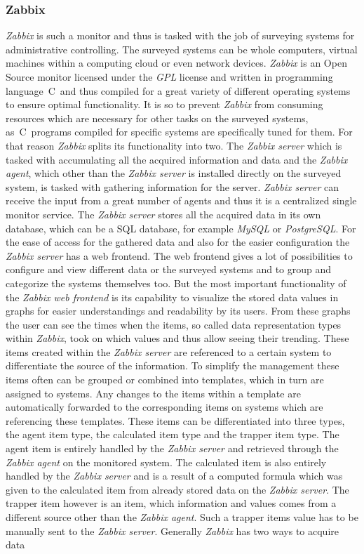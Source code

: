 \subsubsection{Zabbix}
	\textit{Zabbix} is such a monitor and thus is tasked with the job of surveying systems for administrative controlling. The surveyed systems can be whole computers, virtual machines within a computing cloud or even network devices. \textit{Zabbix} is an Open Source monitor licensed under the \textit{GPL} license and written in programming language\ C\ and thus compiled for a great variety of different operating systems to ensure optimal functionality. It is so to prevent \textit{Zabbix} from consuming resources which are necessary for other tasks on the surveyed systems, as\ C\ programs compiled for specific systems are specifically tuned for them. For that reason \textit{Zabbix} splits its functionality into two. The \textit{Zabbix server} which is tasked with accumulating all the acquired information and data and the \textit{Zabbix agent}, which other than the \textit{Zabbix server} is installed directly on the surveyed system, is tasked with gathering information for the server. \textit{Zabbix server} can receive the input from a great number of agents and thus it is a centralized single monitor service. The \textit{Zabbix server} stores all the acquired data in its own database, which can be a SQL database, for example \textit{MySQL} or \textit{PostgreSQL}. For the ease of access for the gathered data and also for the easier configuration the \textit{Zabbix server} has a web frontend. The web frontend gives a lot of possibilities to configure and view different data or the surveyed systems and to group and categorize the systems themselves too. But the most important functionality of the \textit{Zabbix web frontend} is its capability to visualize the stored data values in graphs for easier understandings and readability by its users. From these graphs the user can see the times when the items, so called data representation types within \textit{Zabbix}, took on which values and thus allow seeing their trending. These items created within the \textit{Zabbix server} are referenced to a certain system to differentiate the source of the information. To simplify the management these items often can be grouped or combined into templates, which in turn are assigned to systems. Any changes to the items within a template are automatically forwarded to the corresponding items on systems which are referencing these templates. These items can be differentiated into three types, the agent item type, the calculated item type and the trapper item type. The agent item is entirely handled by the \textit{Zabbix server} and retrieved through the \textit{Zabbix agent} on the monitored system. The calculated item is also entirely handled by the \textit{Zabbix server} and is a result of a computed formula which was given to the calculated item from already stored data on the \textit{Zabbix server}. The trapper item however is an item, which information and values comes from a different source other than the \textit{Zabbix agent}. Such a trapper items value has to be manually sent to the \textit{Zabbix server}. Generally \textit{Zabbix} has two ways to acquire data 